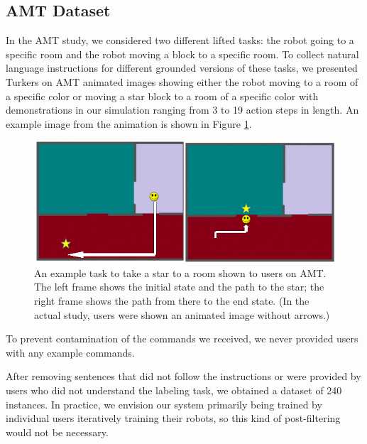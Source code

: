 \documentclass[conference]{IEEEtran}
\begin{document}
\subsection{AMT Dataset}
In the AMT study, we considered two different lifted tasks: the robot going to a specific room and the robot moving a block to a specific room. 
To collect natural language instructions for different grounded versions of these tasks, we presented Turkers on AMT animated images showing either the robot moving to a room of a specific color or moving a star block to a room of a specific color with demonstrations in our simulation ranging from 3 to 19 action steps in length. An example image from the animation is shown in Figure \ref{fig:animation}.
\begin{figure}[tp]
\begin{center}
\includegraphics[width=\columnwidth]{images/map1_2a}
\caption{\small An example task to take a star to a room shown to users on AMT. The left frame shows the initial state and the path to the star; the right frame shows the path from there to the end state. (In the actual study, users were shown an animated image without arrows.)}
\label{fig:animation}
\end{center}
\end{figure}
To prevent contamination of the commands we received, we never provided users with any example commands. 

After removing sentences that did not follow the instructions or were provided by users who did not understand the labeling task,
we obtained a dataset of 240 instances. %
In practice, we envision our system primarily being trained by individual users iteratively training their robots, so this kind of post-filtering would not be necessary.
\end{document}
